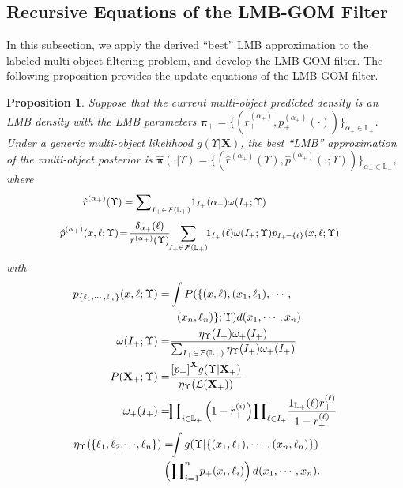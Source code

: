 \documentclass[journal]{IEEEtran}
\newcommand{\bX}{{\mathbf X}}
\newcommand{\bpi}{{\boldsymbol\pi}}
\newtheorem{Pro}{Proposition}
\begin{document}
{\subsection{Recursive Equations of the LMB-GOM Filter}
In this subsection, we apply  the derived ``best'' LMB approximation  to the labeled multi-object filtering problem, and develop the LMB-GOM filter.  The following proposition provides the update equations of the LMB-GOM filter.
\begin{Pro}\label{pro:6}
 Suppose that the current multi-object predicted density is an LMB density with the LMB parameters $\bpi_+=\{(r_+^{(\alpha_{+})},p_+^{(\alpha_{+})}(\cdot))\}_{\alpha_{+}\in\mathbb{L}_+}$. Under a generic multi-object likelihood $g(\Upsilon|\bX)$, the best ``LMB'' approximation of the multi-object posterior is $\hat\bpi(\cdot|\Upsilon)=\{(\hat r^{(\alpha_{+})}(\Upsilon),\hat p^{(\alpha_{+})}(\cdot;\Upsilon))\}_{\alpha_{+}\in\mathbb{L}_+}$, where
\begin{equation}
{\small
\begin{split}
\label{update_r}\!\!\!\!\!\!\!\!\!\!\!\!\!\!\!\!\!\!\!\!\!\!\!\!\!\!\!\!\!\!\hat r^{(\alpha_{+})}(\Upsilon)&={\sum}_{I_{+}\in\mathcal{F}(\mathbb{L}_+)}1_{I_{+}}(\alpha_{+})\omega(I_{+};\Upsilon)
\end{split}}
\end{equation}
\begin{equation}
{\small
\begin{split}
\label{update_p}\hat p^{(\alpha_{+})}(x,\ell;\Upsilon)&\!=\!\frac{\delta_{\alpha_{+}}(\ell)}{ r^{(\alpha_{+})}(\Upsilon)}\!\!\sum_{I_{+}\in\mathcal{F}(\mathbb{L}_+)}\!\!1_{I_{+}}(\ell)\omega(I_{+};\Upsilon)p_{I_{+}\!-\{\ell\}}(x,\ell;\Upsilon)
\end{split}}
\end{equation}
with
\begin{align}
\notag p_{\{\ell_1,\cdots,\ell_n\}}(x,\ell;\Upsilon)=&\int P(\{(x,\ell),(x_1,\ell_1),\cdots, \\ 
\label{update_where}&\,\,\,\,(x_n,\ell_n)\};\Upsilon)d(x_1,\cdots,x_n)\\
\label{update_w-lmb} \omega(I_{+};\Upsilon)= &\frac{\eta_{\Upsilon}(I_{+})\omega_+(I_{+})}{\sum_{I_{+}\in\mathcal{F}(\mathbb{L}_+)}\eta_\Upsilon(I_{+})\omega_+(I_{+})}\\
\label{update_P-lmb} P(\bX_{+};\Upsilon)=&\frac{{[p_+]}^\bX g(\Upsilon|\bX_{+})}{\eta_{\Upsilon}(\mathcal{L}(\bX_{+}))}\\
\label{predict_w-lmb}\omega_+(I_{+})=&\!{\prod}_{i\in\mathbb{L}_+}\left(1-r_+^{(i)}\right)\!{\prod}_{\ell\in I_{+}}\frac{1_{\mathbb{L}_+}(\ell)r_+^{(\ell)}}{1-r_+^{(\ell)}}\\
\notag  \eta_{\Upsilon}(\{\ell_1,\ell_2,\!\cdots\!,\ell_n\})=\!\!&\int g(\Upsilon|\{(x_1,\ell_1),\cdots,(x_n,\ell_n)\}) \\ 
\label{where_2}&\!\!\!\! \left({\prod}_{i=1}^n p_{+}(x_i,\ell_{i})\right)d(x_1,\cdots,x_n).
\end{align}
\end{Pro}




}
\end{document}

